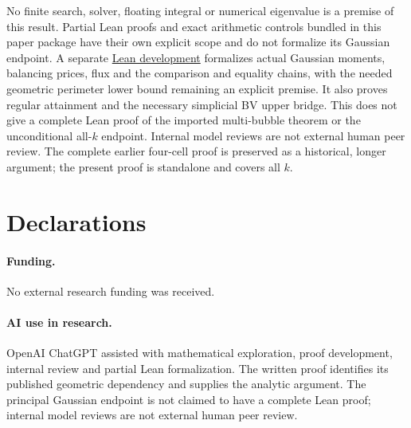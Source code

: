 \documentclass[11pt]{article}
\begin{document}
No finite search, solver, floating integral or numerical eigenvalue is a
premise of this result. Partial Lean proofs and exact arithmetic
controls bundled in this paper package have their own explicit scope and
do not formalize its Gaussian endpoint. A separate
\href{https://github.com/mxym/math/pull/3}{Lean development} formalizes
actual Gaussian moments, balancing prices, flux and the comparison and
equality chains, with the needed geometric perimeter lower bound
remaining an explicit premise. It also proves regular attainment and the
necessary simplicial BV upper bridge. This does not give a complete Lean
proof of the imported multi-bubble theorem or the unconditional
all-\(k\) endpoint. Internal model reviews are not external human peer
review. The complete earlier four-cell proof \cite{FOUR} is preserved as
a historical, longer argument; the present proof is standalone and
covers all \(k\).

\section*{Declarations}
\paragraph{Funding.} No external research funding was received.
\paragraph{AI use in research.} OpenAI ChatGPT assisted with mathematical exploration, proof development, internal review and partial Lean formalization. The written proof identifies its published geometric dependency and supplies the analytic argument. The principal Gaussian endpoint is not claimed to have a complete Lean proof; internal model reviews are not external human peer review.
\end{document}
